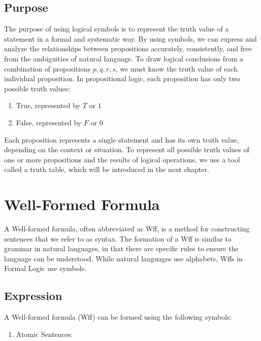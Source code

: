 \documentclass[12pt,a4paper,openany]{article}
\begin{document}
\subsection{Purpose}\label{purpose}

The purpose of using logical symbols is to represent the truth value of
a statement in a formal and systematic way. By using symbols, we can
express and analyze the relationships between propositions accurately,
consistently, and free from the ambiguities of natural language. To draw
logical conclusions from a combination of propositions \(p, q, r, s\),
we must know the truth value of each individual proposition. In
propositional logic, each proposition has only two possible truth values:

\begin{enumerate}
\item True, represented by \(T\) or \(1\)
\item False, represented by \(F\) or \(0\)
\end{enumerate}

Each proposition represents a single statement and has its own truth
value, depending on the context or situation. To represent all possible
truth values of one or more propositions and the results of logical
operations, we use a tool called a truth table, which will be
introduced in the next chapter.

\newpage
\section{Well-Formed Formula}


A Well-formed formula, often abbreviated as Wff, is a method for constructing sentences that we refer to as syntax. The formation of a Wff is similar to grammar in natural languages, in that there are specific rules to ensure the language can be understood. While natural languages use alphabets, Wffs in Formal Logic use symbols.

\subsection{Expression}\label{expression}

A Well-formed formula (Wff) can be formed using the following symbols:

\begin{enumerate}
\item Atomic Sentences:
\end{enumerate}
\end{document}
